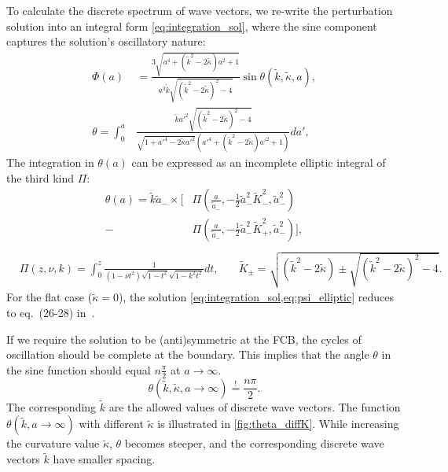 To calculate the discrete spectrum of wave vectors, we re-write the perturbation solution into an integral form \cref{eq:integration_sol}, where the sine component captures the solution's oscillatory nature:
\begin{equation}\label{eq:integration_sol}
\begin{aligned}
    \Phi(a) &= \frac{3\sqrt{a^4 + (\tilde{k}^2 -2\tilde\kappa)a^2 + 1}}{a^3\tilde{k}\sqrt{(\tilde{k}^2 -2\tilde\kappa)^2 - 4}} \sin\theta(\tilde k,\tilde\kappa,a),\\
    \theta = \int_0^a &\frac{\tilde{k} a'^2 \sqrt{(\tilde{k}^2 -2\tilde\kappa)^2 - 4}}{\sqrt{1 + a'^4 - 2\tilde\kappa a'^2} \left( a'^4 + (\tilde{k}^2 -2\tilde\kappa)a'^2 + 1 \right)} da',
\end{aligned}
\end{equation}
The integration in \(\theta(a)\) can be expressed as an incomplete elliptic integral of the third kind \(\Pi\):
\begin{equation}\label{eq:psi_elliptic}
\begin{aligned}
    \theta(a) = \tilde{k} \tilde a_- \times \Bigg[ &\Pi\left( \frac{a}{\tilde a_-}, -\frac{1}{2}\tilde a_-^2 \tilde K_{-}^2, \tilde a_-^2 \right) \\
    - &\Pi\left( \frac{a}{\tilde a_-}, -\frac{1}{2}\tilde a_-^2 \tilde K_{+}^2, \tilde a_-^2 \right) \Bigg],\\
\end{aligned}
\end{equation}
\vspace{-1em}
\begin{equation*}
\begin{aligned}
    &\Pi(z,\nu,k)=\int_0^z \frac{1}{(1-\nu t^2)\sqrt{1-t^2}\sqrt{1-k^2t^2}} dt,\quad
    &\tilde K_{\pm}=\sqrt{(\tilde{k}^2 -2\tilde\kappa) \pm \sqrt{(\tilde{k}^2 -2\tilde\kappa)^2 - 4}}.
\end{aligned}
\end{equation*}
For the flat case (\(\tilde\kappa=0\)), the solution \cref{eq:integration_sol,eq:psi_elliptic} reduces to eq.~(26-28) in~\citet{2022PhRvD.105h3514L}.

If we require the solution to be (anti)symmetric at the FCB, the cycles of oscillation should be complete at the boundary. This implies that the angle \(\theta\) in the sine function should equal \( n\frac{\pi}{2} \) at \( a \rightarrow \infty \). 
\begin{equation}\label{eq:theta}
    \theta(\tilde{k}, \tilde\kappa, a \rightarrow \infty) \overset{!}{=} \frac{n\pi}{2}.
\end{equation}
The corresponding \(\tilde{k}\) are the allowed values of discrete wave vectors. The function \(\theta(\tilde k,a\rightarrow\infty)\) with different \(\tilde\kappa\) is illustrated in \cref{fig:theta_diffK}. While increasing the curvature value \(\tilde\kappa\), \(\theta\) becomes steeper, and the corresponding discrete wave vectors \(\tilde{k}\) have smaller spacing. 


